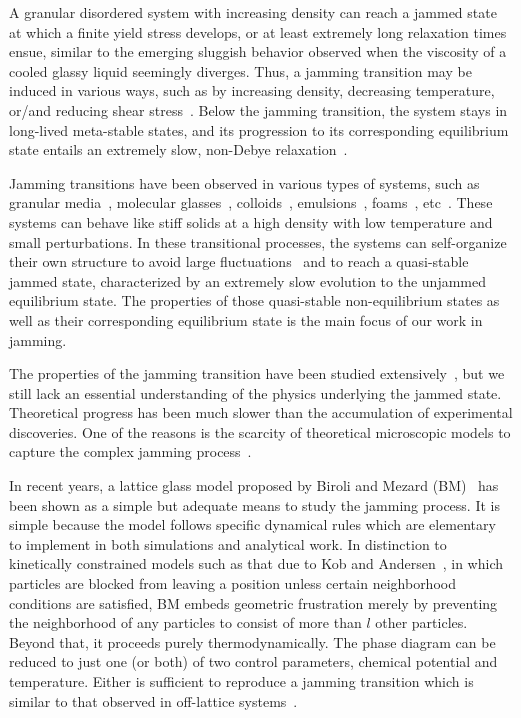 A granular disordered system with increasing density can reach a jammed state at which a finite yield stress develops, or at least extremely long relaxation times
ensue, similar to the emerging sluggish behavior observed when the
viscosity of a cooled glassy liquid seemingly diverges. Thus, a jamming
transition may be induced in various ways, such as by increasing density,
decreasing temperature, or/and reducing shear stress~\cite{Liu2010}.
Below the jamming transition, the system stays in long-lived meta-stable
states, and its progression to its corresponding equilibrium state
entails an extremely slow, non-Debye relaxation~\cite{Hill1985, Ciamarra2010, van2010}.

Jamming transitions have been observed in various types of systems,
such as granular media~\cite{Majmudar2007}, molecular glasses~\cite{Parisi2010,Angelani2007},
colloids~\cite{Trappe2001}, emulsions~\cite{Zhang2005}, foams~\cite{Berthier2011,DaCruz2002},
etc~\cite{Liu2010,van2010}. These systems can behave like stiff solids
at a high density with low temperature and small perturbations. In
these transitional processes, the systems can self-organize their
own structure to avoid large fluctuations~\cite{Berthier2011} and
to reach a quasi-stable jammed state, characterized by an extremely
slow evolution to the unjammed equilibrium state. The properties of
those quasi-stable non-equilibrium states as well as their corresponding
equilibrium state is the main focus of our work in jamming. 


The properties of the jamming transition have been studied 
extensively~\cite{Biroli2007,Majmudar2007,Liu2010}, but we still lack an essential
understanding of the physics underlying the jammed state. Theoretical
progress has been much slower than the accumulation of experimental
discoveries. One of the reasons is the scarcity of theoretical microscopic
models to capture the complex jamming process~\cite{Krzakala2008,Jacquin2011}. 

In recent years, a lattice glass model proposed by Biroli and Mezard
(BM)~\cite{Biroli02} has been shown as a simple but adequate means
to study the jamming process. It is simple because the model follows
specific dynamical rules which are elementary to implement in both
simulations and analytical work. In distinction to kinetically constrained
models such as that due to Kob and Andersen~\cite{Kob93}, in which
particles are blocked from leaving a position unless certain neighborhood
conditions are satisfied, BM embeds geometric frustration merely by
preventing the neighborhood of any particles to consist of more than
$l$ other particles. Beyond that, it proceeds purely thermodynamically.
The phase diagram can be reduced to just one (or both) of two control
parameters, chemical potential and temperature. Either is sufficient
to reproduce a jamming transition which is similar to that observed
in off-lattice systems~\cite{Biroli02}. 

